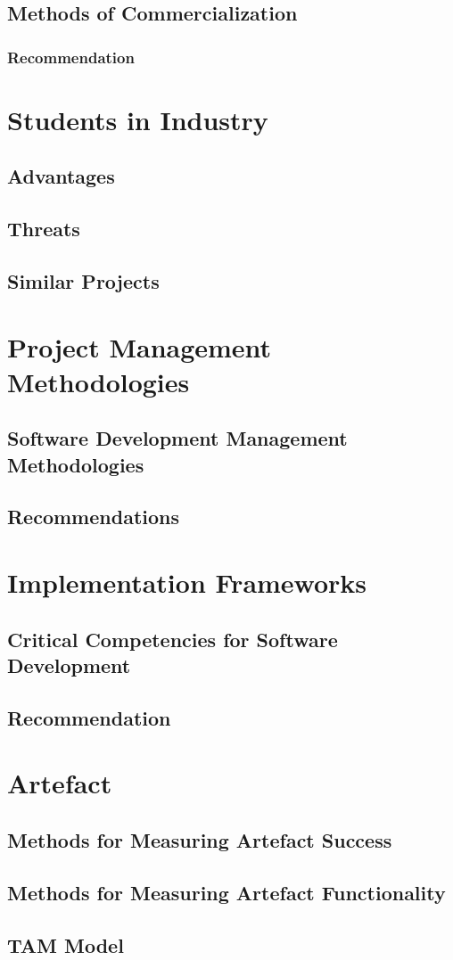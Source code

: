 \subsection{Methods of Commercialization}
\subsubsection{Recommendation}
\section{Students in Industry}
\subsection{Advantages}
\subsection{Threats}
\subsection{Similar Projects}
\section{Project Management Methodologies}
\subsection{Software Development Management Methodologies}
\subsection{Recommendations}
\section{Implementation Frameworks}
\subsection{Critical Competencies for Software Development}
\subsection{Recommendation}
\section{Artefact}
\subsection{Methods for Measuring Artefact Success}
\subsection{Methods for Measuring Artefact Functionality}
\subsection{TAM Model}